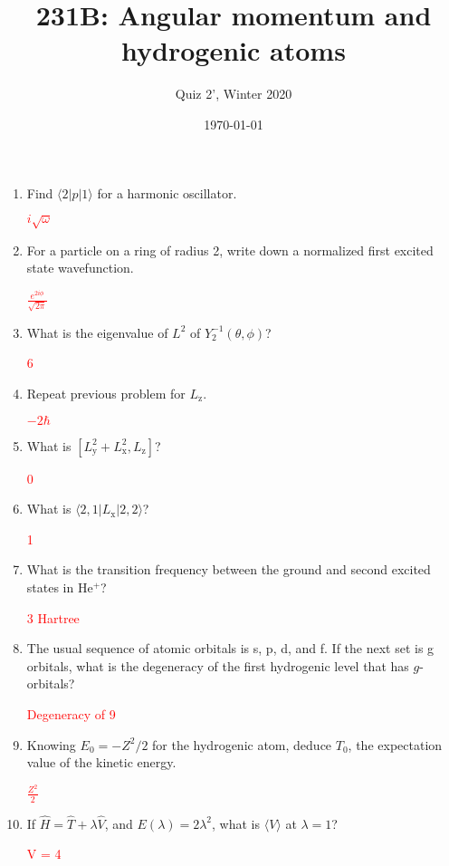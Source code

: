 
\usepackage{xcolor}



\title{231B: Angular momentum and hydrogenic atoms}
\author{Quiz 2', Winter 2020}
\date{\today}
\maketitle

\begin{enumerate}

\item Find $\langle 2 | p | 1 \rangle$ for a harmonic oscillator.

\textcolor{red}{$i\sqrt{\omega}$}

\item For a particle on a ring of radius 2, write down a normalized
first excited state wavefunction.

\textcolor{red}{$\frac{e^{2i\phi}}{\sqrt{2\pi}}$}

\item What is the eigenvalue of $L^2$ of $Y_2^{-1}(\theta,\phi)$?

\textcolor{red}{6}

\item Repeat previous problem for $L_{\text{z}}$.

\textcolor{red}{$-2\hbar$}

\item What is $[L^2_{\text{y}}+L^2_{\text{x}},L_{\text{z}}]$?

\textcolor{red}{0}

\item What is $\langle 2,1| L_{\text{x}} | 2,2 \rangle$?

\textcolor{red}{1}

\item What is the transition frequency between the ground and second
excited states in He$^{+}$?

\textcolor{red}{3 Hartree}

\item The usual sequence of atomic orbitals is s, p, d, and f. If
the next set is g orbitals, what is the degeneracy of the first
hydrogenic level that has $g$-orbitals?

\textcolor{red}{Degeneracy of 9}

\item Knowing $E_0 = -Z^2/2$ for the hydrogenic atom,
deduce $T_0$, the expectation value of the kinetic energy.

\textcolor{red}{$\frac{Z^2}{2}$}

\item If $\hat{H} = \hat{T} + \lambda \hat{V}$, and
$E(\lambda) = 2\lambda^2$, what is $\langle V \rangle$ at $\lambda=1$?

\textcolor{red}{V = 4}

\end{enumerate}

